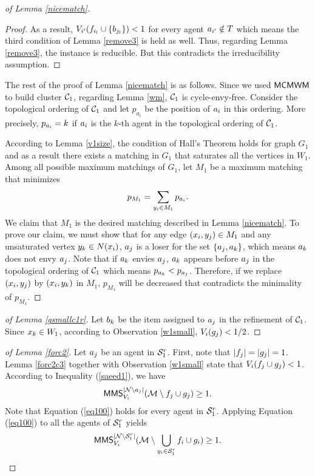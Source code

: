 \begin{proof}[of Lemma \ref{nicematch}]
\begin{proof}
As a result, $V_{i'}(f_{i_l} \cup \{b_{j_l}\}) < 1$ for every agent $a_{i'} \notin T$ which means the third condition of Lemma \ref{remove3} is held as well. Thus, regarding Lemma \ref{remove3}, the instance is reducible. But this contradicts the irreducibility assumption.
\end{proof}

The rest of the proof of Lemma \ref{nicematch} is as follows. Since we used $\textsf{MCMWM}$ to build cluster $\mathcal{C}_1$, regarding Lemma \ref{wm}, $\mathcal{C}_1$ is cycle-envy-free. Consider the topological ordering of $\mathcal{C}_1$ and let $p_{a_i}$ be the position of $a_i$ in this ordering. More precisely, $p_{a_i} = k$ if $a_i$ is the $k$-th agent in the topological ordering of $\mathcal{C}_1$.

According to Lemma \ref{v1size}, the condition of Hall’s Theorem holds for graph $G_1$ and as a result there exists a matching in $G_1$ that saturates all the vertices in $W_1$. Among all possible maximum matchings of $G_1$, let $M_1$ be a maximum matching that minimizes $$p_{M_1} = \sum_{y_i \in M_1} p_{a_i}.$$ We claim that $M_1$ is the desired matching described in Lemma \ref{nicematch}. To prove our claim, we must show that for any edge $(x_i, y_j) \in M_1$ and any unsaturated vertex $y_k \in N(x_i)$, $a_j$ is a loser for the set $\{a_j, a_k\}$, which means $a_k$ does not envy $a_j$. Note that if $a_k$ envies $a_j$, $a_k$ appears before $a_j$ in the topological ordering of $\mathcal{C}_1$ which means $p_{a_k} < p_{a_j}$. Therefore, if we replace $(x_i, y_j)$ by $(x_i, y_k)$ in $M_1$, $p_{M_1}$ will be decreased that contradicts the minimality of $p_{M_1}$.
\end{proof}

\begin{proof}[of Lemma \ref{gsmallc1r}]
Let $b_k$ be the item assigned to $a_j$ in the refinement of $\mathcal{C}_1$. Since $x_k \in W_1$, according to Observation \ref{w1small}, $V_i(g_j)< 1/2$. 
\end{proof}

\begin{proof}[of Lemma \ref{forc2}]
Let $a_j$ be an agent in $\mathcal{S}_1^r$. First, note that $|f_j| = |g_j| = 1$. Lemma \ref{forc2c3} together with Observation \ref{w1small} state that $V_i(f_j \cup g_j)<1$. According to Inequality (\ref{saeed1}), we have  
\begin{equation}
\label{eq100}
\mathsf{MMS}_{V_i}^{|\mathcal{N} \setminus a_j|} ( {\mathcal{M}} \setminus f_j \cup g_j) \geq 1.
\end{equation}
 Note that Equation (\ref{eq100}) holds for every agent in $\mathcal{S}_1^r$. Applying Equation (\ref{eq100}) to all the agents of $\mathcal{S}_1^r$ yields
 \[ \mathsf{MMS}_{V_i}^{|\mathcal{N} \setminus \mathcal{S}_1^r|} ( {\mathcal{M}} \setminus \bigcup_{y_i \in \mathcal{S}_1^r} f_i \cup g_i) \geq 1.\] 


\end{proof}

